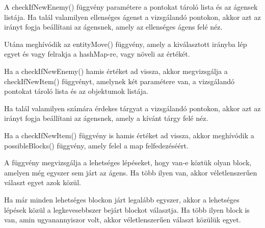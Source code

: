 A checkIfNewEnemy() függvény paramétere a pontokat tároló lista és az ágensek listája. Ha talál valamilyen ellenséges ágenst
a vizsgálandó pontokon, akkor azt az irányt fogja beállítani az ágensnek, amely az ellenséges ágens felé néz.

Utána meghívódik az entityMove() függvény, amely a kiválasztott irányba lép egyet és vagy felrakja a hashMap-re, vagy növeli az értékét.

Ha a checkIfNewEnemy() hamis értéket ad vissza, akkor megvizsgálja a checkIfNewItem() függvényt, amelynek két paramétere van, a
vizsgálandó pontokat tároló lista és az objektumok listája.

Ha talál valamilyen számára érdekes tárgyat a vizsgálandó pontokon, akkor azt az irányt fogja beállítani az ágensnek, amely a kívánt tárgy felé néz.

Ha a checkIfNewItem() függvény is hamis értéket ad vissza, akkor meghívódik a possibleBlocks() függvény, amely felel a map felfedezéséért.

A függvény megvizsgálja a lehetséges lépéseket, hogy van-e köztük olyan block, amelyen még egyszer sem járt az ágens. Ha több ilyen van, akkor
véletlenszerűen választ egyet azok közül.

Ha már minden lehetséges blockon járt legalább egyszer, akkor a lehetséges lépések közül a legkevesebbszer bejárt blockot választja. Ha 
több ilyen block is van, amin ugyanannyiszor volt, akkor véletlenszerűen választ közülük egyet.

